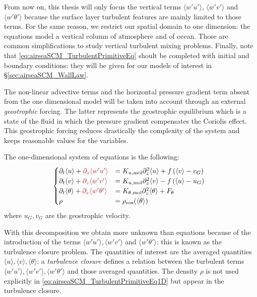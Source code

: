 From now on, this thesis will only focus the vertical terms
$\langle w' u'\rangle$, $\langle w' v'\rangle$ and
$\langle w' \theta'\rangle$
because the surface layer turbulent features are mainly limited
to those terms. For the same reason, we restrict our spatial
domain to one dimension: the equations model a vertical column
of atmosphere and of ocean. Those are common simplifications to
study vertical turbulent mixing problems.
Finally, note that \eqref{eq:airseaSCM_TurbulentPrimitiveEq}
shoult be completed with initial and boundary conditions:
they will be given for our models of interest in
\S\ref{sec:airseaSCM_WallLaw}.
\par
The non-linear advective terms and the horizontal
pressure gradient term absent from the one dimensional model
will be taken into account through an external \textit{geostrophic}
forcing. The latter represents the geostrophic equilibrium which
is a state of the fluid in which the pressure gradient compensates
the Coriolis effect. This geostrophic forcing reduces
drastically the complexity of the system and keeps
reasonable values
for the variables.
\par
The one-dimensional system of
equations is the following:
\begin{equation}
	\label{eq:airseaSCM_TurbulentPrimitiveEq1D}
\begin{cases}
	\partial_t \langle u \rangle
	+ \emphase{\partial_z \langle w' u'\rangle}
	&=
	K_{u, {\rm mol}} \partial_z^2 \langle u\rangle
	+ f \left(\langle v\rangle - v_G\right)
	\\
	\partial_t \langle v\rangle
	+ \emphase{\partial_z \langle w' v'\rangle}
	&=
	K_{u, {\rm mol}} \partial_z^2 \langle v\rangle
	- f \left(\langle u\rangle-u_G\right)\\
	\partial_t \langle\theta\rangle
	+ \emphase{\partial_z \langle w' \theta'\rangle}&=
	K_{\theta, {\rm mol}} \partial_z^2 \langle\theta\rangle
	+ F_\theta\\
	\rho &= \rho_{\rm eos}(\langle\theta\rangle)
\end{cases}
\end{equation}
where $u_G, v_G$ are the geostrophic velocity.
\par
With this decomposition we obtain more unknown than
equations because of the introduction of the terms
$\langle w' u'\rangle, \langle w' v'\rangle$
and $\langle w' \theta'\rangle$:
this is known as the turbulence closure problem.
The quantities of interest are the averaged quantities
$\langle u\rangle, \langle v\rangle, \langle \theta \rangle$:
a \textit{turbulence closure} defines a relation between
the turbulent terms $\langle w' u'\rangle, \langle w' v'\rangle,
\langle w' \theta'\rangle$ and those averaged quantities.
The density $\rho$ is not used explicitly
in \eqref{eq:airseaSCM_TurbulentPrimitiveEq1D}
but appear in the turbulence closure.

